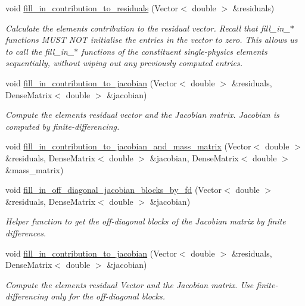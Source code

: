 \begin{DoxyCompactItemize}
void \hyperlink{classoomph_1_1BuoyantQCrouzeixRaviartElement_ab87ed100a54d40884a70a67fcc305ecf}{fill\+\_\+in\+\_\+contribution\+\_\+to\+\_\+residuals} (Vector$<$ double $>$ \&residuals)
\begin{DoxyCompactList}\small\item\em Calculate the element\textquotesingle{}s contribution to the residual vector. Recall that fill\+\_\+in\+\_\+$\ast$ functions M\+U\+ST N\+OT initialise the entries in the vector to zero. This allows us to call the fill\+\_\+in\+\_\+$\ast$ functions of the constituent single-\/physics elements sequentially, without wiping out any previously computed entries. \end{DoxyCompactList}\item 
void \hyperlink{classoomph_1_1BuoyantQCrouzeixRaviartElement_a7bd9313dd697c1219cee4a65692388b5}{fill\+\_\+in\+\_\+contribution\+\_\+to\+\_\+jacobian} (Vector$<$ double $>$ \&residuals, Dense\+Matrix$<$ double $>$ \&jacobian)
\begin{DoxyCompactList}\small\item\em Compute the element\textquotesingle{}s residual vector and the Jacobian matrix. Jacobian is computed by finite-\/differencing. \end{DoxyCompactList}\item 
void \hyperlink{classoomph_1_1BuoyantQCrouzeixRaviartElement_a7d22156d87949e4c64d597d60fe00225}{fill\+\_\+in\+\_\+contribution\+\_\+to\+\_\+jacobian\+\_\+and\+\_\+mass\+\_\+matrix} (Vector$<$ double $>$ \&residuals, Dense\+Matrix$<$ double $>$ \&jacobian, Dense\+Matrix$<$ double $>$ \&mass\+\_\+matrix)
\item 
void \hyperlink{classoomph_1_1BuoyantQCrouzeixRaviartElement_a5c64aaf8e6cefc31d89c62c28fc6f19b}{fill\+\_\+in\+\_\+off\+\_\+diagonal\+\_\+jacobian\+\_\+blocks\+\_\+by\+\_\+fd} (Vector$<$ double $>$ \&residuals, Dense\+Matrix$<$ double $>$ \&jacobian)
\begin{DoxyCompactList}\small\item\em Helper function to get the off-\/diagonal blocks of the Jacobian matrix by finite differences. \end{DoxyCompactList}\item 
void \hyperlink{classoomph_1_1BuoyantQCrouzeixRaviartElement_a7bd9313dd697c1219cee4a65692388b5}{fill\+\_\+in\+\_\+contribution\+\_\+to\+\_\+jacobian} (Vector$<$ double $>$ \&residuals, Dense\+Matrix$<$ double $>$ \&jacobian)
\begin{DoxyCompactList}\small\item\em Compute the element\textquotesingle{}s residual Vector and the Jacobian matrix. Use finite-\/differencing only for the off-\/diagonal blocks. \end{DoxyCompactList}\item 

\end{DoxyCompactItemize}

